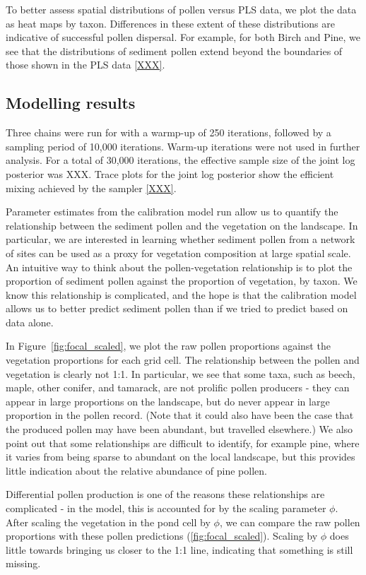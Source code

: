 \documentclass[12pt]{article}
\begin{document}
To better assess spatial distributions of pollen versus PLS data, we plot the data as heat maps by taxon. Differences in these extent of these distributions are indicative of successful pollen dispersal. For example, for both Birch and Pine, we see that the distributions of sediment pollen extend beyond the boundaries of those shown in the PLS data \ref{XXX}.

\subsection{Modelling results}

Three chains were run for with a warmp-up of 250 iterations, followed
by a sampling period of 10,000 iterations. Warm-up iterations were not
used in further analysis. For a total of 30,000 iterations, the
effective sample size of the joint log posterior was XXX. Trace plots
for the joint log posterior show the efficient mixing achieved by the
sampler \ref{XXX}.

Parameter estimates from the calibration model run allow us to
quantify the relationship between the sediment pollen and the
vegetation on the landscape. In particular, we are interested in
learning whether sediment pollen from a network of sites can be used
as a proxy for vegetation composition at large spatial scale. An
intuitive way to think about the pollen-vegetation relationship is to
plot the proportion of sediment pollen against the proportion of
vegetation, by taxon. We know this relationship is complicated, and
the hope is that the calibration model allows us to better predict
sediment pollen than if we tried to predict based on data alone. 

In Figure~\ref{fig:focal_scaled}, we plot the raw pollen proportions
against the vegetation proportions for each grid cell. The
relationship between the pollen and vegetation is clearly not 1:1. In
particular, we see that some taxa, such as beech, maple, other
conifer, and tamarack, are not prolific pollen producers - they can
appear in large proportions on the landscape, but do never appear in
large proportion in the pollen record. (Note that it could also have
been the case that the produced pollen may have been abundant, but
travelled elsewhere.) We also point out that some relationships are
difficult to identify, for example pine, where it varies from being
sparse to abundant on the local landscape, but this provides little
indication about the relative abundance of pine pollen.

Differential pollen production is one of the reasons these
relationships are complicated - in the model, this is accounted for by
the scaling parameter $\phi$. After scaling the vegetation in the pond
cell by $\phi$, we can compare the raw pollen proportions with these
pollen predictions (\ref{fig:focal_scaled}). Scaling by $\phi$ does little towards bringing us closer to the 1:1 line, indicating that something is still missing.
\end{document}
